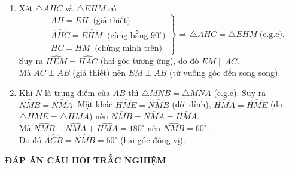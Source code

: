 \begin{ex}
{\begin{enumerate}
\[\left.\begin{aligned}&\widehat{HAM}=\widehat{HEC}\;\;\text {(so le trong)}\\& AH=EH\;\; \text{(giả thiết)}\\&\widehat{AHC}=\widehat{EHC}\;\;\text {(cùng bằng $90^\circ$)}
\end{aligned}\right\}\Rightarrow \triangle AHC=\triangle EHC\;  \text{(g.c.g)}.\]
Do đó $HM=HC$ (hai cạnh tương ứng) hay $H$ là trung điểm của $MC$.
\item Xét $\triangle AHC$ và $\triangle EHM$ có 
\[\left.\begin{aligned}&AH=EH\;\;\text {(giả thiết)}\\& \widehat{AHC}=\widehat{EHM}\;\; \text{(cùng bằng $90^\circ$)}\\&HC=HM\;\;\text {(chứng minh trên)}
\end{aligned}\right\}\Rightarrow \triangle AHC=\triangle EHM\;  \text{(c.g.c)}.\]
Suy ra $\widehat{HEM}=\widehat{HAC}$ (hai góc tương ứng), do đó $EM\parallel AC$.\\
Mà $AC\perp AB$ (giả thiết) nên $EM\perp AB$ (từ vuông góc đến song song). 
\item Khi $N$ là trung điểm của $AB$ thì $\triangle MNB=\triangle MNA$ (c.g.c). Suy ra $\widehat{NMB}=\widehat{NMA}$. Mặt khác $\widehat{HME}=\widehat{NMB}$ (đối đỉnh), $\widehat{HMA}=\widehat{HME}$ (do $\triangle HME=\triangle HMA$) nên $\widehat{NMB}=\widehat{NMA}=\widehat{HMA}$.\\
Mà $\widehat{NMB}+\widehat{NMA}+\widehat{HMA}=180^\circ$ nên $\widehat{NMB}=60^\circ$.\\
Do đó $\widehat{ACB}=\widehat{NMB}=60^\circ$ (hai góc đồng vị).
\end{enumerate}
}
\end{ex}

\begin{center}
	\textbf{ĐÁP ÁN CÂU HỎI TRẮC NGHIỆM}
\end{center}
\boxans

	

